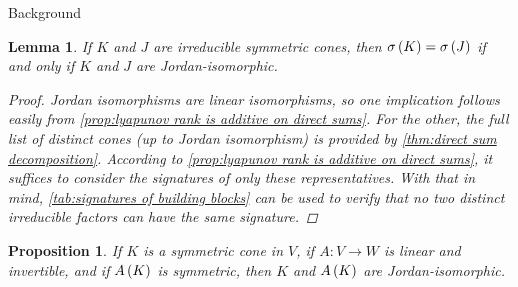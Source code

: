 \documentclass{interact}
\theoremstyle{plain}
\newtheorem{lemma}[theorem]{Lemma}
\newtheorem{proposition}[theorem]{Proposition}
\theoremstyle{definition}
\theoremstyle{remark}
\newcommand*{\signature}[1]{ \sigma\of{#1} }
\begin{document}
\begin{section}{Background}
    \begin{lemma}\label{lem:signatures determine isomorphism for irreducible}
      If $K$ and $J$ are irreducible symmetric cones, then
      $\signature{K} = \signature{J}$ if and only if $K$ and $J$ are
      Jordan-isomorphic.
      \begin{proof}
        Jordan isomorphisms are linear isomorphisms, so one
        implication follows easily from \cref{prop:lyapunov rank is
          additive on direct sums}. For the other, the full list of
        distinct cones (up to Jordan isomorphism) is provided by
        \cref{thm:direct sum decomposition}. According to
        \cref{prop:lyapunov rank is additive on direct sums}, it
        suffices to consider the signatures of only these
        representatives.  With that in mind, \cref{tab:signatures of
          building blocks} can be used to verify that no two distinct
        irreducible factors can have the same signature.
      \end{proof}
    \end{lemma}

    \begin{proposition}\label{prop:linear isomorphism implies jordan}
      If $K$ is a symmetric cone in $V$, if $A : V \to W$ is linear
      and invertible, and if $A\left({K}\right)$ is symmetric, then $K$ and
      $A\left({K}\right)$ are Jordan-isomorphic.


\end{proposition}
\end{section}
\end{document}
